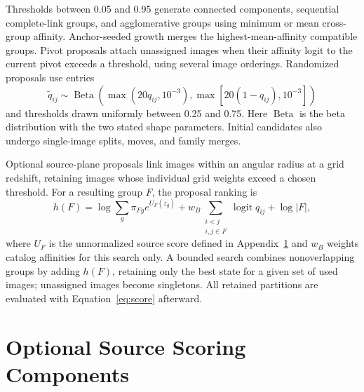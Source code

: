 \documentclass[twocolumn,twocolappendix,linenumbers]{aastex701}
\newcommand{\logit}{\operatorname{logit}}
\begin{document}
Thresholds between 0.05 and 0.95 generate connected components, sequential complete-link groups, and agglomerative groups using minimum or mean cross-group affinity.
Anchor-seeded growth merges the highest-mean-affinity compatible groups.
Pivot proposals attach unassigned images when their affinity logit to the current pivot exceeds a threshold, using several image orderings.
Randomized proposals use entries
\begin{equation}
 \widetilde q_{ij}\sim\operatorname{Beta}
 \left(\max(20q_{ij},10^{-3}),
       \max[20(1-q_{ij}),10^{-3}]\right)
 \label{eq:noisy}
\end{equation}
and thresholds drawn uniformly between 0.25 and 0.75.
Here $\operatorname{Beta}$ is the beta distribution with the two stated shape parameters.
Initial candidates also undergo single-image splits, moves, and family merges.

Optional source-plane proposals link images within an angular radius at a grid redshift, retaining images whose individual grid weights exceed a chosen threshold.
For a resulting group $F$, the proposal ranking is
\begin{equation}
 h(F)=\log\sum_g\pi_{Fg}e^{U_F(z_g)}
      +w_B\sum_{\substack{i<j\\i,j\in F}}\logit q_{ij}
      +\log|F|,
 \label{eq:beamscore}
\end{equation}
where $U_F$ is the unnormalized source score defined in Appendix~\ref{app:optional} and $w_B$ weights catalog affinities for this search only.
A bounded search combines nonoverlapping groups by adding $h(F)$, retaining only the best state for a given set of used images; unassigned images become singletons.
All retained partitions are evaluated with Equation~\ref{eq:score} afterward.

\section{Optional Source Scoring Components}
\label{app:optional}
\end{document}
